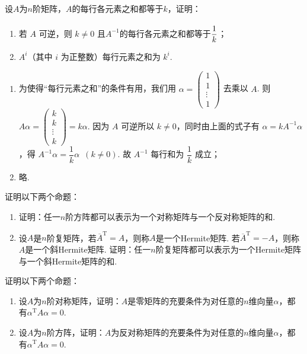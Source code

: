 \begin{exercise}
\begin{exgroup}
        \item 设$A$为$n$阶矩阵，$A$的每行各元素之和都等于$k$，证明：
        \begin{enumerate}
            \item 若 $A$ 可逆，则 $k \neq 0$ 且$A^{-1}$的每行各元素之和都等于$\vphantom{\cfrac{1}{k}}\dfrac{1}{k}$；
            \item $A^i$（其中 $i$ 为正整数）每行元素之和为 $k^i$.
        \end{enumerate}

        \begin{answer}
            \begin{enumerate}
                \item 为使得``每行元素之和''的条件有用，我们用 $\alpha=\begin{pmatrix}1 \\ 1 \\ \vdots \\ 1\end{pmatrix}$ 去乘以 $A$. 则 $A\alpha=\begin{pmatrix}k \\ k \\ \vdots \\ k\end{pmatrix}=k\alpha$. 因为 $A$ 可逆所以 $k\neq 0$，同时由上面的式子有 $\alpha=kA^{-1}\alpha$，得 $A^{-1}\alpha=\dfrac{1}{k}\alpha\enspace(k\neq 0)$. 故 $A^{-1}$ 每行和为 $\dfrac{1}{k}$ 成立；
                \item 略.
            \end{enumerate}
        \end{answer}

        \item 证明以下两个命题：
        \begin{enumerate}
            \item 证明：任一$n$阶方阵都可以表示为一个对称矩阵与一个反对称矩阵的和.
            \item 设$A$是$n$阶复矩阵，若$\overline{A}^\mathrm{T}=A$，则称$A$是一个Hermite矩阵. 若$\overline{A}^\mathrm{T}=-A$，则称$A$是一个斜Hermite矩阵. 证明：任一$n$阶复矩阵都可以表示为一个Hermite矩阵与一个斜Hermite矩阵的和.
        \end{enumerate}
        \begin{answer}

        \end{answer}

        \item 证明以下两个命题：
        \begin{enumerate}
            \item 设$A$为$n$阶对称矩阵，证明：$A$是零矩阵的充要条件为对任意的$n$维向量$\alpha$，都有$\alpha^\mathrm{T}A\alpha=0$.
            \item 设$A$为$n$阶方阵，证明：$A$为反对称矩阵的充要条件为对任意的$n$维向量$\alpha$，都有$\alpha^\mathrm{T}A\alpha=0$.
        \end{enumerate}
        \begin{answer}


\end{answer}
\end{exgroup}
\end{exercise}
